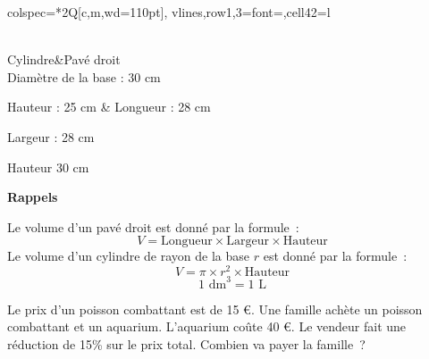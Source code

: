 \documentclass[addpoints,format=DNB]{commun}
\begin{document}
\begin{questions}
\begin{parts}
\begin{subparts}
\begin{minipage}{.4\linewidth}
\begin{tblr}{%
                        colspec=*{2}{Q[c,m,wd=110pt]},
                        vlines,row{1,3}={font=\bfseries},cell{4}{2}={l}
                        }
                    \\
                    Cylindre&Pavé droit\\
                    Diamètre de la base : 30 cm\par
                    Hauteur : 25 cm\vskip50pt
                    &
                    Longueur : 28 cm\par
                    Largeur : 28 cm\par
                    Hauteur 30 cm\\
                    \hline
                \end{tblr}
            \end{minipage}\hskip80pt
            \begin{minipage}{.3\linewidth}
                {\centering\Large\textbf{Rappels}\par}\noindent
                Le volume d'un pavé droit est donné par la formule~:
                $$V = \text{Longueur}\times\text{Largeur}\times\text{Hauteur}$$
                Le volume d'un cylindre de rayon de la base $r$ est donné par la formule~:
                $$V=\pi\times r^2\times\text{Hauteur}$$
                $$1\text{ dm}^3=1\text{ L}$$
            \end{minipage}\par
            \subpart Le prix d'un poisson combattant est de 15 \euro. Une famille
            achète un poisson combattant et un aquarium. L'aquarium coûte 40 \euro.
            Le vendeur fait une réduction de 15\% sur le prix total. Combien va
            payer la famille~?
        \end{subparts}
    \end{parts}
\end{questions}
\end{document}

